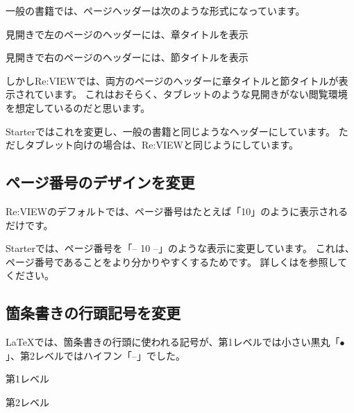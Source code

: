 一般の書籍では、ページヘッダーは次のような形式になっています。

\begin{starteritemize}
\item 見開きで左のページのヘッダーには、章タイトルを表示
\item 見開きで右のページのヘッダーには、節タイトルを表示
\end{starteritemize}

しかしRe:VIEWでは、両方のページのヘッダーに章タイトルと節タイトルが表示されています。
これはおそらく、タブレットのような見開きがない閲覧環境を想定しているのだと思います。

Starterではこれを変更し、一般の書籍と同じようなヘッダーにしています。
ただしタブレット向けの場合は、Re:VIEWと同じようにしています。

\subsection*{ページ番号のデザインを変更}
\label{sec:1-2-14}

Re:VIEWのデフォルトでは、ページ番号はたとえば「10」のように表示されるだけです。

Starterでは、ページ番号を「-- 10 --」のような表示に変更しています。
これは、ページ番号であることをより分かりやすくするためです。
詳しくはを参照してください。

\subsection*{箇条書きの行頭記号を変更}
\label{sec:1-2-15}

\LaTeX{}では、箇条書きの行頭に使われる記号が、第1レベルでは小さい黒丸「$\bullet$」、第2レベルではハイフン「--」でした。

{\renewcommand{\labelitemii}{--}
\begin{starterprogram}\end{starterprogram}
\noindent
{}

\starterresult

\begin{starteritemize}
\item 第1レベル

\begin{starteritemize}
\item 第2レベル
\end{starteritemize}

\end{starteritemize}

\endstarterresult
}

